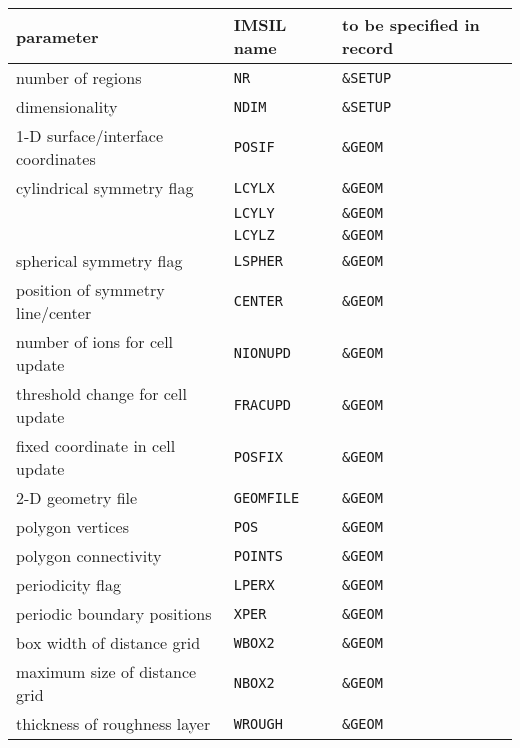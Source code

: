 \begin{center}
\begin{tabular}{lll}
parameter \quad                   & IMSIL name    & to be specified in record \\
\hline
number of regions                 & \texttt{NR}      & \texttt{\&SETUP} \\
dimensionality                    & \texttt{NDIM}    & \texttt{\&SETUP} \\
1-D surface/interface coordinates & \texttt{POSIF}   & \texttt{\&GEOM} \\
cylindrical symmetry flag         & \texttt{LCYLX}   & \texttt{\&GEOM} \\
                                  & \texttt{LCYLY}   & \texttt{\&GEOM} \\
                                  & \texttt{LCYLZ}   & \texttt{\&GEOM} \\
spherical symmetry flag           & \texttt{LSPHER}  & \texttt{\&GEOM} \\
position of symmetry line/center  & \texttt{CENTER}  & \texttt{\&GEOM} \\
number of ions for cell update    & \texttt{NIONUPD} & \texttt{\&GEOM} \\
threshold change for cell update  & \texttt{FRACUPD} & \texttt{\&GEOM} \\
fixed coordinate in cell update   & \texttt{POSFIX}  & \texttt{\&GEOM} \\
2-D geometry file                 & \texttt{GEOMFILE} & \texttt{\&GEOM} \\
polygon vertices                  & \texttt{POS}     & \texttt{\&GEOM} \\
polygon connectivity              & \texttt{POINTS}  & \texttt{\&GEOM} \\
periodicity flag                  & \texttt{LPERX}   & \texttt{\&GEOM} \\
periodic boundary positions       & \texttt{XPER}    & \texttt{\&GEOM} \\
box width of distance grid        & \texttt{WBOX2}   & \texttt{\&GEOM} \\
maximum size of distance grid     & \texttt{NBOX2}   & \texttt{\&GEOM} \\
thickness of roughness layer      & \texttt{WROUGH}  & \texttt{\&GEOM} \\

\end{tabular}
\end{center}

